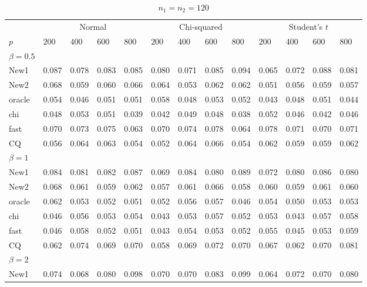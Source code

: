 \documentclass[review]{elsarticle}
\theoremstyle{plain}
\theoremstyle{definition}
\theoremstyle{remark}
\begin{document}
\begin{table}[ht]
\caption{$n_1=n_2=120$} 
\label{hahaha}
\vspace{3mm}
\centering
\begin{tabular}{lllllllllllll}
\toprule
    &   \multicolumn{4}{c}{Normal} & \multicolumn{4}{c}{Chi-squared}& \multicolumn{4}{c}{Student's $t$}  \\
    \cmidrule(r){2-5}
\cmidrule(r){6-9}
\cmidrule(r){10-13}
    $p$ & $200$ & $400$ & $600$ & $800$ & $200$ & $400$ & $600$ & $800$ & $200$ & $400$ & $600$ & $800$ \\ 
\midrule
    $\beta=0.5$\\
New1 & 0.087 & 0.078 & 0.083 & 0.085 & 0.080 & 0.071 & 0.085 & 0.094 & 0.065 & 0.072 & 0.088 & 0.081 \\ 
New2 & 0.068 & 0.059 & 0.060 & 0.066 & 0.064 & 0.053 & 0.062 & 0.062 & 0.051 & 0.056 & 0.059 & 0.057 \\ 
oracle & 0.054 & 0.046 & 0.051 & 0.051 & 0.058 & 0.048 & 0.053 & 0.052 & 0.043 & 0.048 & 0.051 & 0.044 \\ 
chi & 0.048 & 0.053 & 0.051 & 0.039 & 0.042 & 0.049 & 0.048 & 0.038 & 0.052 & 0.046 & 0.042 & 0.046 \\ 
fast & 0.070 & 0.073 & 0.075 & 0.063 & 0.070 & 0.074 & 0.078 & 0.064 & 0.078 & 0.071 & 0.070 & 0.071 \\ 
CQ & 0.056 & 0.064 & 0.063 & 0.054 & 0.052 & 0.064 & 0.066 & 0.054 & 0.062 & 0.059 & 0.059 & 0.062 \\ 
    $\beta=1$\\
New1 & 0.084 & 0.081 & 0.082 & 0.087 & 0.069 & 0.084 & 0.080 & 0.089 & 0.072 & 0.080 & 0.086 & 0.080 \\ 
New2 & 0.068 & 0.061 & 0.059 & 0.062 & 0.057 & 0.061 & 0.066 & 0.058 & 0.060 & 0.059 & 0.061 & 0.060 \\ 
oracle & 0.062 & 0.053 & 0.052 & 0.051 & 0.052 & 0.056 & 0.057 & 0.046 & 0.054 & 0.050 & 0.053 & 0.053 \\ 
chi & 0.046 & 0.056 & 0.053 & 0.054 & 0.043 & 0.053 & 0.057 & 0.052 & 0.053 & 0.043 & 0.057 & 0.058 \\ 
fast & 0.046 & 0.058 & 0.052 & 0.051 & 0.043 & 0.054 & 0.053 & 0.052 & 0.055 & 0.045 & 0.053 & 0.059 \\ 
CQ & 0.062 & 0.074 & 0.069 & 0.070 & 0.058 & 0.069 & 0.072 & 0.070 & 0.067 & 0.062 & 0.070 & 0.081 \\ 
    $\beta=2$\\
New1 & 0.074 & 0.068 & 0.080 & 0.098 & 0.070 & 0.070 & 0.083 & 0.099 & 0.064 & 0.072 & 0.070 & 0.080 \\ 

\end{tabular}
\end{table}
\end{document}
